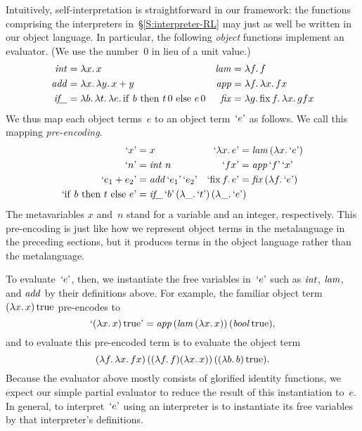 \documentclass[preprint]{sigplanconf}
\newcommand{\fun}[1]{\mathopen{\lambda\mathord{#1}.\,}}
\newcommand{\fix}[1]{\mathopen{\mathrm{fix\,}\mathord{#1}.\,}}
\newcommand{\cond}[3]{\mathrm{if\ }#1\mathrm{\ then\ }#2\mathrm{\ else\ }#3}
\newcommand{\True}{\mathinner{\mathrm{true}}}
\newcommand{\encode}[1]{\mathinner{\mathopen{\text{`}}#1\mathclose{\text{'}}}}
\newcommand{\ident}[1]{\mathinner{\text{\textit{#1\/}}}}
\begin{document}
Intuitively, self\hyp interpretation is straightforward in our
framework: the functions comprising the interpreters
in~\S\ref{S:interpreter-RL} may just as well be written in our object
language.  In particular, the following \emph{object} functions implement an
evaluator.  (We use the number~$0$ in lieu of a unit value.)
\begin{align*}
    \ident{int} &= \fun{x} x &
    \ident{lam} &= \fun{f} f \\
    \ident{add} &= \fun{x} \fun{y} x+y &
    \ident{app} &= \fun{f} \fun{x} fx \\
    \ident{if\_}&= \fun{b} \fun{t} \fun{e} \cond{b}{t\,0}{e\,0} &
    \ident{fix} &= \fun{g} \fix{f} \fun{x} gfx
\end{align*}
We thus map each object terms~$e$ to an object term~$\encode{e}$ as follows.
We call this mapping \emph{pre-encoding}.
\begin{align*}
    \encode{x} &= x &
    \encode{\fun{x}e} &= \ident{lam} (\fun{x} \encode{e}) \\
    \encode{n} &= \ident{int}\, n &
    \encode{fx} &= \ident{app} \encode{f} \encode{x} \\
    \encode{e_1 + e_2} &= \ident{add} \encode{e_1} \encode{e_2} &
    \encode{\fix{f}e} &= \ident{fix} (\fun{f} \encode{e}) \\
    \encode{\cond{b}{t}{e}} &= \rlap{$\ident{if\_} \encode{b}
        \left(\fun{\_}\encode{t}\right) \left(\fun{\_}\encode{e}\right)$}
\end{align*}
The metavariables $x$ and~$n$ stand for a variable and an integer,
respectively.
This pre-encoding is just like how we represent object terms in the
metalanguage in the preceding sections, but it produces
terms in the object language rather than the metalanguage.

To evaluate~$\encode{e}$, then, we
instantiate the free variables in~$\encode{e}$ such as $\ident{int}$,
$\ident{lam}$, and $\ident{add}$ by their definitions above.  For
example, the familiar object term $(\fun{x}x)\True$ pre-encodes to
\begin{equation*}
    \encode{(\fun{x}x)\True} = \ident{app}
    (\ident{lam} (\fun{x} x))\, (\ident{bool} \True),
\end{equation*}
and to evaluate this pre-encoded term is to evaluate the object term
\begin{equation*}
    (\fun{f} \fun{x} fx) \,
    ((\fun{f} f) (\fun{x} x))\, ((\fun{b} b) \True).
\end{equation*}
Because the evaluator above mostly consists of glorified identity
functions, we expect our simple partial evaluator to reduce the
result of this instantiation to~$e$.  In general, to
interpret~$\encode{e}$ using an interpreter is to instantiate its free
variables by that interpreter's definitions.
\end{document}

